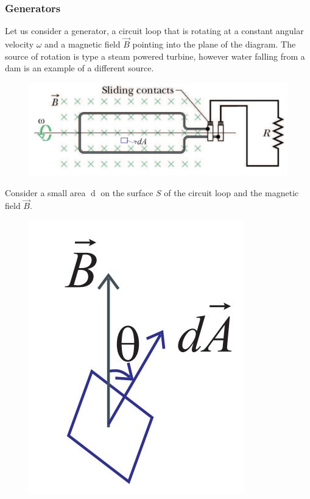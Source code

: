 \subsubsection*{Generators}

Let us consider a generator, a circuit loop that is rotating at a constant angular velocity $\omega$ and a magnetic field $\vec{B}$ pointing into the plane of the diagram. The source of rotation is type a steam powered turbine, however water falling from a dam is an example of a different source. 

\begin{figure}[h!]
    \centering
    \includegraphics[scale=0.5]{notes/images/Generator-1.JPG}
\end{figure}
\FloatBarrier

Consider a small area $\mathop{\mathrm{d}\vec{A}}$ on the surface $S$ of the circuit loop and the magnetic field $\vec{B}$.

\begin{figure}[h!]
    \centering
    \includegraphics[scale=0.3]{notes/images/Generator-2.JPG}
\end{figure}
\FloatBarrier

